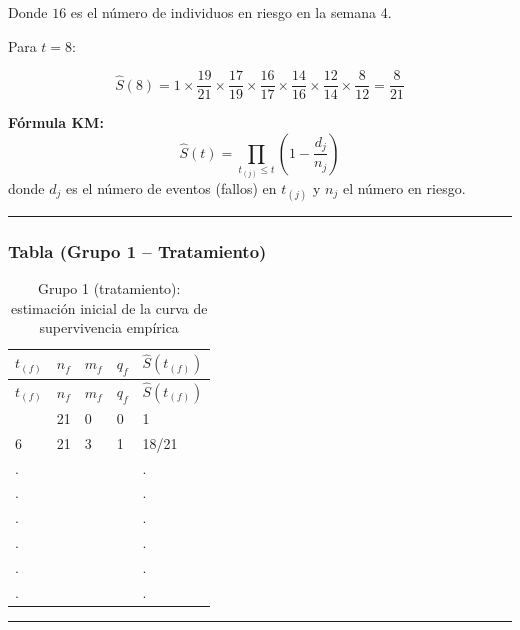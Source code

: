 \documentclass[
]{article}
\begin{document}
\begin{tcolorbox}
Donde \(16\) es el número de individuos en riesgo en la semana 4.

Para \(t = 8\):

\[
\hat{S}(8) = 1 \times \frac{19}{21} \times \frac{17}{19} \times \frac{16}{17} \times \frac{14}{16} \times \frac{12}{14} \times \frac{8}{12} = \frac{8}{21}
\]

\end{tcolorbox}

\textbf{Fórmula KM:}\\
\[
\hat{S}(t) = \prod_{t_{(j)} \le t} \left( 1 - \frac{d_j}{n_j} \right)
\] donde \(d_j\) es el número de eventos (fallos) en \(t_{(j)}\) y
\(n_j\) el número en riesgo.

\begin{center}\rule{0.5\linewidth}{0.5pt}\end{center}

\subsubsection{Tabla (Grupo 1 --
Tratamiento)}\label{tabla-grupo-1-tratamiento}

\begin{longtable}[]{@{}lllll@{}}
\caption{Grupo 1 (tratamiento): estimación inicial de la curva de
supervivencia empírica}\tabularnewline
\toprule\noalign{}
\(t_{(f)}\) & \(n_f\) & \(m_f\) & \(q_f\) & \(\hat{S}(t_{(f)})\) \\
\midrule\noalign{}
\endfirsthead
\toprule\noalign{}
\(t_{(f)}\) & \(n_f\) & \(m_f\) & \(q_f\) & \(\hat{S}(t_{(f)})\) \\
\midrule\noalign{}
\endhead
\bottomrule\noalign{}
\endlastfoot
0 & 21 & 0 & 0 & 1 \\
6 & 21 & 3 & 1 & 18/21 \\
. & & & & . \\
. & & & & . \\
. & & & & . \\
. & & & & . \\
. & & & & . \\
. & & & & . \\
\end{longtable}

\begin{center}\rule{0.5\linewidth}{0.5pt}\end{center}
\end{document}
